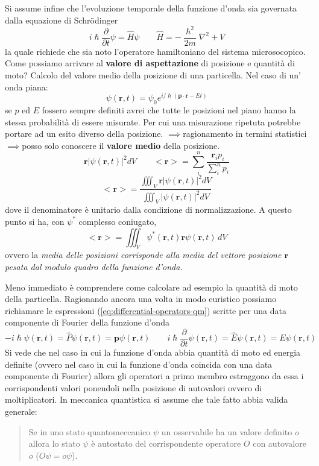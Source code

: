 Si assume infine che l'evoluzione temporale della funzione d'onda sia
governata dalla equazione di Schrödinger
\[
	i \hslash \frac{\partial}{\partial t} \psi = \hat{H} \psi \qquad \hat{H} = - \frac{\hslash^{2}}{2m} \nabla^{2} + V
\]
la quale richiede che sia noto l'operatore hamiltoniano del sistema microsocopico.
Come possiamo arrivare al \textbf{valore di aspettazione} di
posizione e quantità di moto?
Calcolo del valore medio della posizione
di una particella.
Nel caso di un' onda piana: \[
	\psi(\bm{r},t) = \psi_{0} e^{ i/\hslash (\bm{p} \cdot \bm{r}-Et) }
\] se \(p\) ed \(E\) fossero sempre definiti avrei che tutte le
posizioni nel piano hanno la stessa probabilità di essere misurate.
Per
cui una misurazione ripetuta potrebbe portare ad un esito diverso della
posizione. \(\implies\)ragionamento in termini
statistici\(\implies\)posso solo conoscere il \textbf{valore medio}
della posizione. \[
	\bm{r} |\psi(\bm{r},t)|^{2}dV \qquad <\bm{r}> = \sum_{i}^{n} \frac{\bm{r}_{i}p_{i}}{\sum_{i}^{n}p_{i}}
\]
\begin{equation}
	<\bm{r}> = \frac{\iiint_{V} \bm{r} |\psi(\bm{r},t)|^{2}dV }{\iiint_{V}|\psi(\bm{r},t)|^{2}dV }
	\label{eq:mean-value-quantum-position}
\end{equation} dove il denominatore è unitario dalla condizione di
normalizzazione.
A questo punto si ha, con \(\psi^*\) complesso
coniugato, \[
	<\bm{r}> = \iiint_{V} \psi^*(\bm{r},t)\bm{r}\psi(\bm{r},t)\,dV
\] ovvero la \emph{media delle posizioni corrisponde alla media del
	vettore posizione \(\bm{r}\) pesata dal modulo quadro della funzione
	d'onda.}

Meno immediato è comprendere come calcolare ad esempio la quantità di
moto della particella.
Ragionando ancora una volta in modo euristico
possiamo richiamare le espressioni (\ref{eq:differential-operators-qm}) scritte per
una data componente di Fourier della funzione d'onda
\[
	- i \hslash \psi(\bm{r},t) = \hat{P} \psi(\bm{r},t) = \bm{p} \psi(\bm{r},t) \qquad
	i \hslash \frac{\partial}{\partial t} \psi(\bm{r},t) = \hat{E}\psi(\bm{r},t)= E\psi(\bm{r},t)
\] Si vede che nel caso in cui la funzione d'onda abbia quantità di moto
ed energia definite (ovvero nel caso in cui la funzione d'onda coincida
con una data componente di Fourier) allora gli operatori a primo membro
estraggono da essa i corrispondenti valori ponendoli nella posizione di
autovalori ovvero di moltiplicatori.
In meccanica quantistica si assume
che tale fatto abbia valida generale:
\begin{quote}
	Se in uno stato quantomeccanico \(\psi\) un osservabile ha un valore
	definito \(o\) allora lo stato \(\psi\) è autostato del corrispondente
	operatore \(O\) con autovalore \(o\) (\(O \psi = o \psi\)).
\end{quote}


